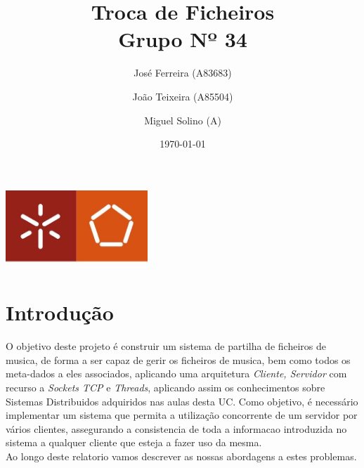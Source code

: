 \documentclass[a4paper]{report}
\begin{document}
\title{Troca de Ficheiros\\ 
\large Grupo Nº 34}
\author{José Ferreira (A83683) \and João Teixeira (A85504) \and Miguel Solino (A)}
\date{\today}

\begin{center}
    \begin{minipage}{0.75\linewidth}
        \centering
        \includegraphics[width=0.4\textwidth]{eng.jpeg}\par\vspace{1cm}
        \vspace{1.5cm}
        \href{https://www.uminho.pt/PT}
        {\color{black}{\scshape\LARGE Universidade do Minho}} \par
        \vspace{1cm}
        \href{https://www.di.uminho.pt/}
        {\color{black}{\scshape\Large Departamento de Informática}} \par
        \vspace{1.5cm}
        \maketitle
    \end{minipage}
\end{center}

\tableofcontents

\pagebreak

\chapter{Introdução}

O objetivo deste projeto é construir um sistema de partilha de ficheiros de 
musica, de forma a ser capaz de gerir os ficheiros de musica, bem como todos
os meta-dados a eles associados, aplicando uma arquitetura 
\textit{Cliente, Servidor} com recurso a \textit{Sockets TCP} e \textit{Threads},
aplicando assim os conhecimentos sobre Sistemas Distribuidos adquiridos nas 
aulas desta UC\@.
Como objetivo, é necessário implementar um sistema que permita a utilização 
concorrente de um servidor por vários clientes, assegurando a consistencia
de toda a informacao introduzida no sistema a qualquer cliente que esteja
a fazer uso da mesma.\\
Ao longo deste relatorio vamos descrever as nossas abordagens a estes problemas.
\end{document}
